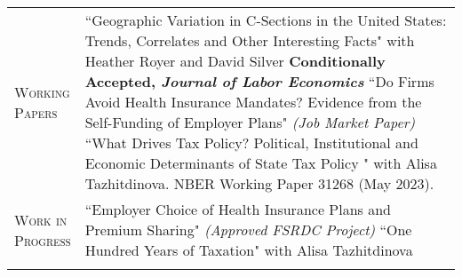 \documentclass[11pt]{article}
\newcommand{\xspace}{19pt}
\begin{document}
\begin{tabularx}{\textwidth}{@{}Y Z@{}}
	\textsc{Working \newline Papers} & 
	``Geographic Variation in C-Sections in the United States: Trends, Correlates \newline and Other Interesting Facts" with Heather Royer and David Silver \newline \textbf{Conditionally Accepted, \textit{Journal of Labor Economics}}
	\vspace{10pt} \newline
	``Do Firms Avoid Health Insurance Mandates? Evidence from the Self-Funding \newline of Employer Plans"  \textit{(Job Market Paper)}
	\vspace{10pt} \newline
	``What Drives Tax Policy? Political, Institutional and Economic Determinants of \newline State Tax Policy " with Alisa Tazhitdinova. NBER Working Paper 31268 (May 2023).
     \\ \addlinespace[\xspace] 
    
    \textsc{Work in \newline Progress}  & 
    ``Employer Choice of Health Insurance Plans and Premium Sharing"
    \newline \textit{(Approved FSRDC Project)}
    \vspace{10pt} \newline
    ``One Hundred Years of Taxation" with Alisa Tazhitdinova
     \\ \addlinespace[\xspace] 


\end{tabularx}
\end{document}
